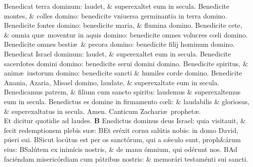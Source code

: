 \documentclass[a5paper,10pt]{book}
\def\ae{æ}
\def\oe{œ}
\begin{document}
\begin{multicols*}{2}
\newline \color{red} B\color{black}enedicat terra dominum: laudet, \& superexaltet eum in secula.
\newline \color{red} B\color{black}enedicite montes, \& colles domino: benedicite vniuersa germinantia in terra domino.
\newline \color{red} B\color{black}enedicite fontes domino: benedicite maria, \& flumina domino.
\newline \color{red} B\color{black}enedicite cete, \& omnia qu\ae \ moventur in aquis domino: benedicite omnes volucres c\oe li domino.
\newline \color{red} B\color{black}enedicite omnes besti\ae \ \& pecora domino: benedicite filij hominum domino.
\newline \color{red} B\color{black}enedicat Israel dominum: laudet, \& superexaltet eum in secula.
\newline \color{red} B\color{black}enedicite sacerdotes domini domino: benedicite serui domini domino.
\newline \color{red} B\color{black}enedicite spiritus, \& anim\ae \ iustorum domino: benedicite sancti \& humiles corde domino.
\newline \color{red} B\color{black}enedicite Anania, Azaria, Misael domino, laudate, \& superexaltate eum in secula.
\newline \color{red} B\color{black}enedicamus patrem, \& filium cum sancto spiritu: laudemus \& superexaltemus eum in secula.
\newline \color{red} B\color{black}enedictus es domine in firmamento c\oe li: \& laudabilis \& gloriosus, \& superexaltatus in secula. Amen.
\newline {} \color{red} Canticum Zachari\ae \ prophet\ae .\\Et dicitur quotidie ad laudes. \color{black}
\vspace{-1em}
\lettrine[lines=2]{\bfseries \color{red} B}{}
Enedictus dominus deus Israel: quia visitauit, \& fecit redemptionem plebis su\ae :
\newline \color{red} B\color{black}Et eréxit cornu salútis nobis: in domo David, púeri sui.
\newline \color{red} B\color{black}Sicut locútus est per os sanctórum, qui a sǽculo sunt, proph\&árum eius:
\newline \color{red} B\color{black}Salútem ex inimícis nostris, \& de manu ómnium, qui odérunt nos.
\newline \color{red} B\color{black}Ad faciéndam misericórdiam cum pátribus nostris: \& memorári testaménti sui sancti.

\end{multicols*}
\end{document}
